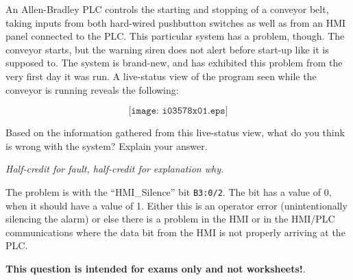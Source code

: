 

An Allen-Bradley PLC controls the starting and stopping of a conveyor belt, taking inputs from both hard-wired pushbutton switches as well as from an HMI panel connected to the PLC.  This particular system has a problem, though.  The conveyor starts, but the warning siren does not alert before start-up like it is supposed to.  The system is brand-new, and has exhibited this problem from the very first day it was run.  A live-status view of the program seen while the conveyor is running reveals the following:

$$\texttt{[image: i03578x01.eps]}$$

Based on the information gathered from this live-status view, what do you think is wrong with the system?  Explain your answer.







{\it Half-credit for fault, half-credit for explanation why.}

\vskip 10pt

The problem is with the ``HMI\_Silence'' bit {\tt B3:0/2}.  The bit has a value of 0, when it should have a value of 1.  Either this is an operator error (unintentionally silencing the alarm) or else there is a problem in the HMI or in the HMI/PLC communications where the data bit from the HMI is not properly arriving at the PLC.







{\bf This question is intended for exams only and not worksheets!}.



